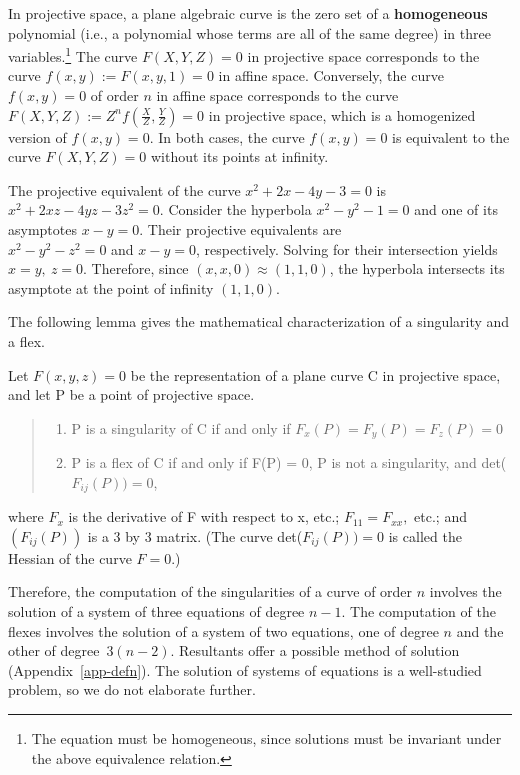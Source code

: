 In projective space, a plane algebraic curve is the zero set of a
{\bf homogeneous} polynomial (i.e., a polynomial whose terms are all of the
same degree) in three variables.\footnote{The equation must be homogeneous,
since solutions must be invariant under the above equivalence relation.}
The curve $F(X,Y,Z) = 0$ in projective space corresponds to the curve 
$f(x,y) := F(x,y,1) = 0$ in affine space.
Conversely, the curve $f(x,y) = 0$ of order $n$ in 
affine space corresponds to the curve $F(X,Y,Z) := Z^{n}f(\frac{X}{Z},
\frac{Y}{Z}) = 0$ in projective space, which is a homogenized version of 
$f(x,y) = 0$.
In both cases, the curve $f(x,y) = 0$ is equivalent to the curve 
$F(X,Y,Z) = 0$ without its points at infinity.
%
\begin{example}
The projective equivalent of the curve \mbox{$x^{2}+2x-4y-3=0$} is
\mbox{$x^{2}+2xz-4yz-3z^{2}=0$}.
Consider the hyperbola \mbox{$x^{2}-y^{2}-1=0$} and one of its asymptotes
\mbox{$x-y=0$}.
Their projective equivalents are\\
\mbox{$x^{2}-y^{2}-z^{2}=0$}
and \mbox{$x-y=0$}, respectively.
Solving for their intersection yields \mbox{$x=y,\ z=0$}.
Therefore, since \mbox{$(x,x,0) \approx (1,1,0)$}, the hyperbola 
intersects its asymptote at the point of infinity \mbox{$(1,1,0)$}.
\end{example}

The following lemma gives the mathematical characterization of a
singularity and a flex.
%
\begin{lemma}[{\cite[pp. 51,71]{wa}}]
\label{lem-singflex}
Let $F(x,y,z) = 0$ be the representation of a plane curve C in projective
space, and let P be a point of projective space.
\begin{quote}
\begin{enumerate}
\item P is a singularity of C if and only if
$F_{x}(P) = F_{y}(P) = F_{z}(P) = 0$
\item P is a flex of C if and only if F(P) = 0, 
P is not a singularity, and \mbox{det($F_{ij}(P)) = 0$},
\end{enumerate}
\end{quote}
%
where $F_{x}$ is the derivative of F with respect to x, etc.;
$F_{11}=F_{xx},$ etc.;
and $(F_{ij}(P))$ is a 3 by 3 matrix.
(The curve \mbox{det($F_{ij}(P)) = 0$} is called the Hessian of the 
curve $F=0$.)
\end{lemma}

Therefore, the computation of the singularities of a curve of order $n$ involves
the solution of a system of three equations of degree $n-1$.
The computation of the flexes involves the solution of
a system of two equations, one of
degree $n$ and the other of \mbox{degree $3(n-2)$}.
Resultants offer a possible method of solution (Appendix~\ref{app-defn}).
The solution of systems of equations is a well-studied problem,
so we do not elaborate further.

